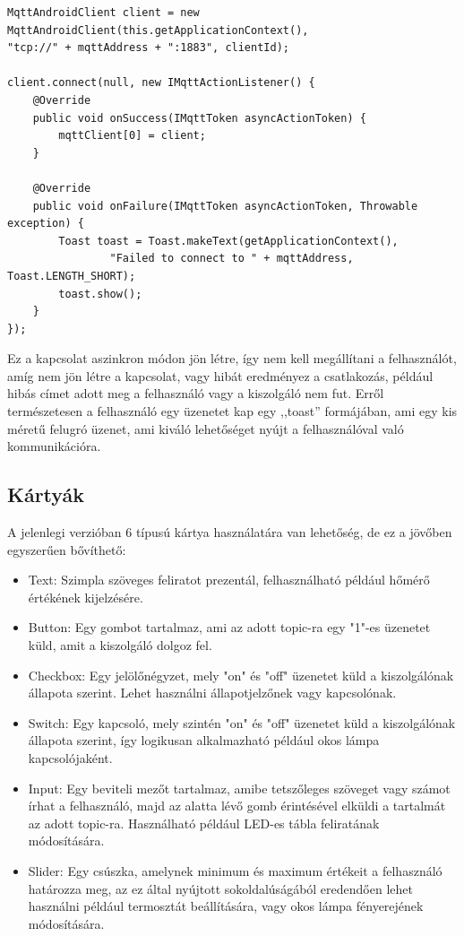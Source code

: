 \documentclass[
]{thesis-ekf}
\theoremstyle{definition}
\theoremstyle{remark}
\begin{document}
\lstset{language=Java}  
\begin{lstlisting}[frame=single]
MqttAndroidClient client = new MqttAndroidClient(this.getApplicationContext(),
"tcp://" + mqttAddress + ":1883", clientId);

client.connect(null, new IMqttActionListener() {
	@Override
	public void onSuccess(IMqttToken asyncActionToken) {
		mqttClient[0] = client;
	}

	@Override
	public void onFailure(IMqttToken asyncActionToken, Throwable exception) {
		Toast toast = Toast.makeText(getApplicationContext(),
				"Failed to connect to " + mqttAddress, Toast.LENGTH_SHORT);
		toast.show();
	}
});
\end{lstlisting}

Ez a kapcsolat aszinkron módon jön létre, így nem kell megállítani a felhasználót, amíg nem jön létre a
kapcsolat, vagy hibát eredményez a csatlakozás, például hibás címet adott meg a felhasználó vagy
a kiszolgáló nem fut. Erről természetesen a felhasználó egy üzenetet kap egy ,,toast'' formájában, ami egy
kis méretű felugró üzenet, ami kiváló lehetőséget nyújt a felhasználóval való kommunikációra.

\subsection{Kártyák}
A jelenlegi verzióban 6 típusú kártya használatára van lehetőség, de ez a jövőben egyszerűen bővíthető:
\begin{itemize}
	\item Text: Szimpla szöveges feliratot prezentál, felhasználható például hőmérő értékének kijelzésére.
	\item Button: Egy gombot tartalmaz, ami az adott topic-ra egy "1"-es üzenetet küld, amit a kiszolgáló
	dolgoz fel.
	\item Checkbox: Egy jelölőnégyzet, mely "on" és "off" üzenetet küld a kiszolgálónak állapota szerint.
	Lehet használni állapotjelzőnek vagy kapcsolónak.
	\item Switch: Egy kapcsoló, mely szintén "on" és "off" üzenetet küld a kiszolgálónak állapota szerint,
	így logikusan alkalmazható például okos lámpa kapcsolójaként.
	\item Input: Egy beviteli mezőt tartalmaz, amibe tetszőleges szöveget vagy számot írhat a felhasználó,
	majd az alatta lévő gomb érintésével elküldi a tartalmát az adott topic-ra. Használható például LED-es
	tábla feliratának módosítására.
	\item Slider: Egy csúszka, amelynek minimum és maximum értékeit a felhasználó határozza meg, az ez
	által nyújtott sokoldalúságából eredendően lehet használni például termosztát beállítására, vagy
	okos lámpa fényerejének módosítására.
\end{itemize}
\end{document}
